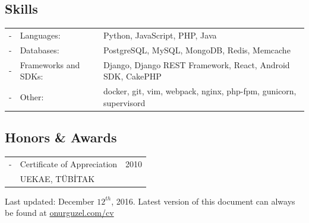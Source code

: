 \documentclass[11pt,a4paper]{article}
\begin{document}
\subsection*{Skills}
\begin{tabularx}{\textwidth}{l l X}
- & Languages: & Python, JavaScript, PHP, Java\\
- & Databases: & PostgreSQL, MySQL, MongoDB, Redis, Memcache\\
- & Frameworks and SDKs: & Django, Django REST Framework, React, Android SDK, CakePHP\\
- & Other: & docker, git, vim, webpack, nginx, php-fpm, gunicorn, supervisord
\end{tabularx}

\subsection*{Honors \& Awards}
\begin{tabularx}{\textwidth}{l X r}
- & Certificate of Appreciation & 2010\\
& UEKAE, TÜBİTAK
\end{tabularx}

\vspace{10pt}
\footnotesize {\color[gray]{0.25} Last updated: December $12^{th}$, 2016. Latest version of this document can always be found at \href{http://onurguzel.com/cv}{\color{black}onurguzel.com/cv}}
\end{document}

